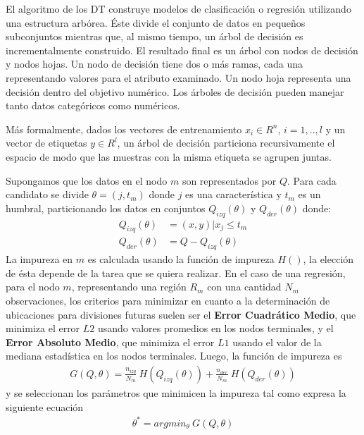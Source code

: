     \par El algoritmo de los DT construye modelos de clasificación o regresión
      utilizando una estructura arbórea. Éste divide el conjunto de datos en pequeños
      subconjuntos mientras que, al mismo tiempo, un árbol de decisión es incrementalmente
      construido. El resultado final es un árbol con nodos de decisión y nodos hojas.
      Un nodo de decisión tiene dos o más ramas, cada una representando valores para
      el atributo examinado. Un nodo hoja representa una decisión dentro del
      objetivo numérico. Los árboles de decisión pueden manejar tanto datos
      categóricos como numéricos.


    \par Más formalmente, dados los vectores de entrenamiento $x_{i} \in R^{n}$, $i = 1,..,l$
      y un vector de etiquetas $y \in R^{l}$, un árbol de decisión particiona
      recursivamente el espacio de modo que las muestras con la misma etiqueta se agrupen juntas.


    \par Supongamos que los datos en el nodo $m$ son representados por $Q$. Para cada
      candidato se divide $\theta = (j, t_{m})$ donde $j$ es una característica y
      $t_{m}$ es un humbral, particionando los datos en conjuntos $Q_{izq}(\theta)$ y
      $Q_{der}(\theta)$ donde:
      \begin{align}
        Q_{izq}(\theta) &= (x, y) | x_{j} \leq t_m \\
        Q_{der}(\theta) &= Q - Q_{izq}(\theta)
      \end{align}
      La impureza en $m$ es calculada usando la función de impureza $H()$, la elección
      de ésta depende de la tarea que se quiera realizar.
      En el caso de una regresión, para el nodo $m$, representando una
      región $R_{m}$ con una cantidad $N_{m}$ observaciones, los criterios
      para minimizar en cuanto a la determinación de ubicaciones para divisiones
      futuras suelen ser el \textbf{Error Cuadrático Medio}, que minimiza el error $L2$ usando
      valores promedios en los nodos terminales, y el \textbf{Error Absoluto Medio}, que minimiza
      el error $L1$ usando el valor de la mediana estadística en los nodos terminales.
      Luego, la función de impureza es
      \begin{align}
        G(Q, \theta) = \frac{n_{izq}}{N_{m}} \ H(Q_{izq}(\theta)) + \frac{n_{der}}{N_{m}} \ H(Q_{der}(\theta))
      \end{align}
      y se seleccionan los parámetros que minimicen la impureza tal como expresa la
      siguiente ecuación
      \begin{align}
        \theta^{*} = argmin_{\theta} \ G(Q, \theta)
      \end{align}

